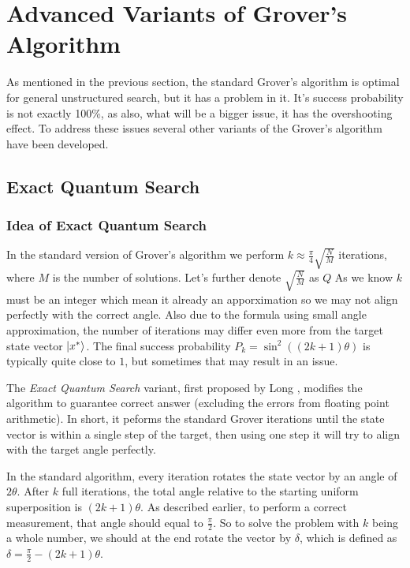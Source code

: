 \section{Advanced Variants of Grover's Algorithm}
\label{sec:advanced_grover}
%
%

As mentioned in the previous section, the standard Grover's algorithm is  optimal for general unstructured search, but it has a problem in it. 
It's success probability is not exactly 100\%, as also, what will be a bigger issue, it has the overshooting effect. 
To address these issues several other variants of the Grover's algorithm have been developed.
%
%

\subsection{Exact Quantum Search}
%
%

\subsubsection{Idea of Exact Quantum Search}

In the standard version of Grover's algorithm we perform $k \approx \frac{\pi}{4}\sqrt{\frac{N}{M}}$ iterations, where $M$ is the number of solutions. 
Let's further denote $\sqrt{\frac{N}{M}}$ as $Q$
As we know $k$ must be an integer which mean it already an apporximation so we may not align perfectly with the correct angle. 
Also due to the formula using small angle approximation, the number of iterations may differ even more from the target state vector $\ket{x^*}$. 
The final success probability $P_k = \sin^2((2k+1)\theta)$ is typically 
quite close to $1$, but sometimes that may result in an issue.
%
%

\bigskip
The \textit{Exact Quantum Search} variant, first proposed by Long \cite{long2001grover}, modifies the algorithm 
to guarantee correct answer (excluding the errors from floating point arithmetic). 
In short, it peforms the standard Grover iterations until the state vector is within a single step of the target, 
then using one step it will try to align with the target angle perfectly.
%
%

\bigskip
In the standard algorithm, every iteration rotates the state vector by an angle of $2\theta$. 
After $k$ full iterations, the total angle relative to the starting uniform superposition is $(2k+1)\theta$.
As described earlier, to perform a correct measurement, that angle should equal to $\frac{\pi}{2}$. 
So to solve the problem with $k$ being a whole number, we should at the end rotate the vector by $\delta$, which is defined as $\delta = \frac{\pi}{2} - (2k+1)\theta$.
%
%

